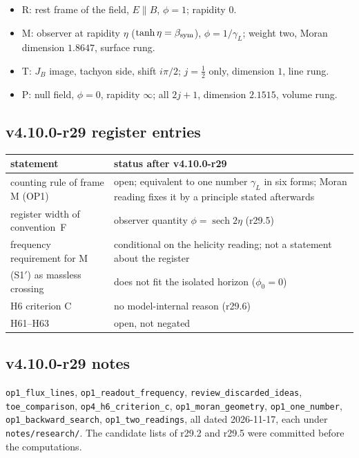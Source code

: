 \begin{itemize}[leftmargin=2em]
\item R: rest frame of the field, \(E\parallel B\), \(\phi=1\); rapidity \(0\).
\item M: observer at rapidity \(\eta\) (\(\tanh\eta=\beta_{\rm sym}\)), \(\phi=1/\gamma_L\); weight two, Moran dimension \(1.8647\), surface rung.
\item T: \(J_B\) image, tachyon side, shift \(i\pi/2\); \(j=\tfrac12\) only, dimension \(1\), line rung.
\item P: null field, \(\phi=0\), rapidity \(\infty\); all \(2j+1\), dimension \(2.1515\), volume rung.
\end{itemize}

\subsection*{v4.10.0-r29 register entries}
\label{subsec:v4100-r29-register}

\begin{center}
\small
\begin{tabular}{@{}>{\raggedright\arraybackslash}p{}>{\raggedright\arraybackslash}p{}@{}}
\toprule
statement & status after v4.10.0-r29\\
\midrule
counting rule of frame M (OP1) & open; equivalent to one number \(\gamma_L\) in six forms; Moran reading fixes it by a principle stated afterwards\\
register width of convention~F & observer quantity \(\phi=\operatorname{sech}2\eta\) (r29.5)\\
frequency requirement for M & conditional on the helicity reading; not a statement about the register\\
(S1\('\)) as massless crossing & does not fit the isolated horizon (\(\phi_0=0\))\\
H6 criterion C & no model-internal reason (r29.6)\\
H61--H63 & open, not negated\\
\bottomrule
\end{tabular}
\end{center}

\subsection*{v4.10.0-r29 notes}
\label{subsec:v4100-r29-notes}

\texttt{op1\_\allowbreak flux\_\allowbreak lines}, \texttt{op1\_\allowbreak readout\_\allowbreak frequency}, \texttt{review\_\allowbreak discarded\_\allowbreak ideas},
\texttt{toe\_\allowbreak comparison}, \texttt{op4\_\allowbreak h6\_\allowbreak criterion\_\allowbreak c}, \texttt{op1\_\allowbreak moran\_\allowbreak geometry},
\texttt{op1\_\allowbreak one\_\allowbreak number}, \texttt{op1\_\allowbreak backward\_\allowbreak search}, \texttt{op1\_\allowbreak two\_\allowbreak readings}, all dated
2026-11-17, each under \texttt{notes/\allowbreak research/}.  The candidate lists of r29.2 and r29.5 were committed before the computations.

